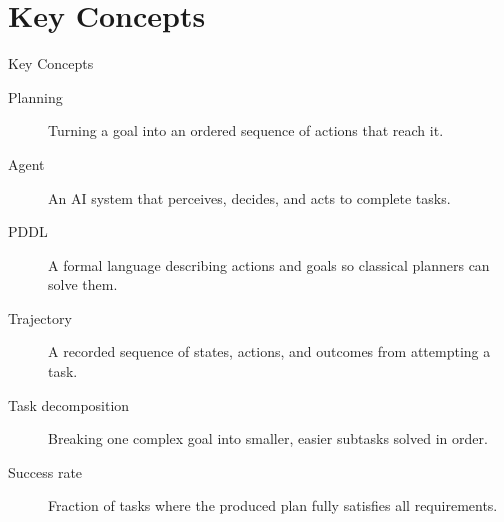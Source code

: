 \documentclass[10pt]{beamer}
\begin{document}
\section{Key Concepts}
\begin{frame}[allowframebreaks]{Key Concepts}
  \begin{description}
    \item[Planning] Turning a goal into an ordered sequence of actions that reach it.
    \item[Agent] An AI system that perceives, decides, and acts to complete tasks.
    \item[PDDL] A formal language describing actions and goals so classical planners can solve them.
    \item[Trajectory] A recorded sequence of states, actions, and outcomes from attempting a task.
    \item[Task decomposition] Breaking one complex goal into smaller, easier subtasks solved in order.
    \item[Success rate] Fraction of tasks where the produced plan fully satisfies all requirements.
  \end{description}
\end{frame}
\end{document}
